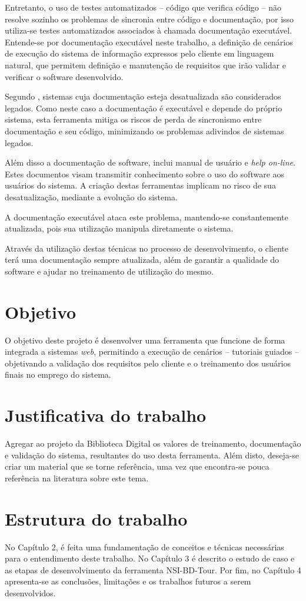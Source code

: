 Entretanto, o uso de testes automatizados – código que verifica código – não resolve sozinho os problemas de sincronia entre código e documentação, por isso utiliza-se testes automatizados associados à chamada documentação executável. Entende-se por documentação executável neste trabalho, a definição de cenários de execução do sistema de informação expressos pelo cliente em linguagem natural, que permitem definição e manutenção de requisitos que irão validar e verificar o software desenvolvido.

Segundo , sistemas cuja documentação esteja desatualizada são considerados legados. Como neste caso a documentação é executável e depende do próprio sistema, esta ferramenta mitiga os riscos de perda de sincronismo entre documentação e seu código, minimizando os problemas adivindos de sistemas legados.

Além disso a documentação de software, inclui manual de usuário e \textit{help on-line}. Estes documentos visam transmitir conhecimento sobre o uso do software aos usuários do sistema. A criação destas ferramentas implicam no risco de sua desatualização, mediante a evolução do sistema.

A documentação executável ataca este problema, mantendo-se constantemente atualizada, pois sua utilização manipula diretamente o sistema.

Através da utilização destas técnicas no processo de desenvolvimento, o cliente terá uma documentação sempre atualizada, além de garantir a qualidade do software e ajudar no treinamento de utilização do mesmo.

\section{Objetivo}

O objetivo deste projeto é desenvolver uma ferramenta que funcione de forma integrada a sistemas \textit{web}, permitindo a execução de cenários – tutoriais guiados – objetivando a validação dos requisitos pelo cliente e o treinamento dos usuários finais no emprego do sistema.


\section{Justificativa do trabalho}

Agregar ao projeto da Biblioteca Digital os valores de treinamento, documentação e validação do sistema, resultantes do uso desta ferramenta. Além disto, deseja-se criar um material que se torne referência, uma vez que encontra-se pouca referência na literatura sobre este tema.

\section{Estrutura do trabalho}

No Capítulo 2, é feita uma fundamentação de conceitos e técnicas necessárias para o entendimento deste trabalho. No Capítulo 3 é descrito o estudo de caso e as etapas de desenvolvimento da ferramenta NSI-BD-Tour. Por fim, no Capítulo 4 apresenta-se as conclusões, limitações e os trabalhos futuros a serem desenvolvidos.